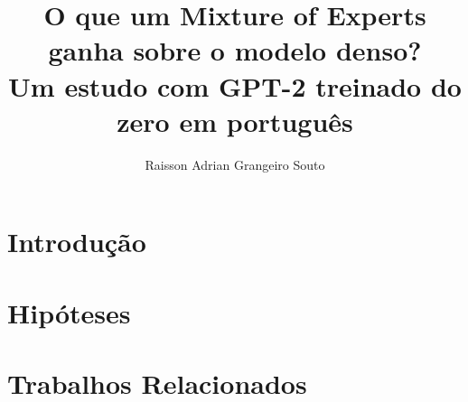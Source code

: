 \documentclass[12pt]{article}
\title{O que um Mixture of Experts ganha sobre o modelo denso?\\
Um estudo com GPT-2 treinado do zero em português}
\author{Raisson Adrian Grangeiro Souto\inst{1}}
\begin{document}
\maketitle

\begin{abstract}
\end{abstract}

\begin{resumo}
\end{resumo}


\section{Introdução}\label{sec:intro}

\section{Hipóteses}\label{sec:hipoteses}

\section{Trabalhos Relacionados}\label{sec:relacionados}
\end{document}
